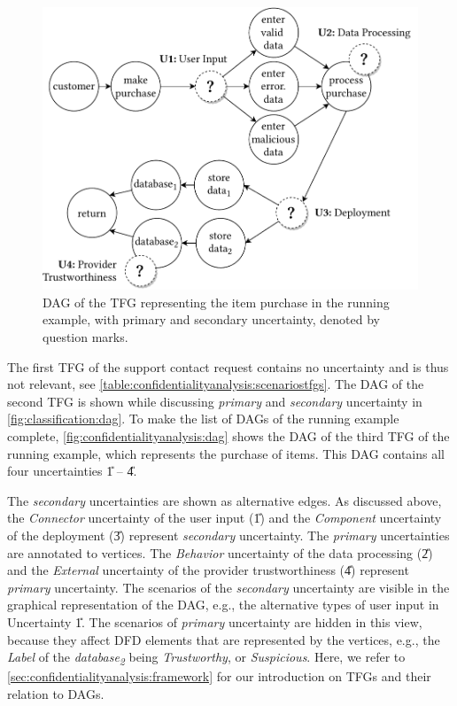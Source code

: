 \begin{figure}
    \centering
    \includegraphics[width=0.9\linewidth]{figures/chapter7/lastdag.pdf}
    \caption{\acf*{DAG} of the \acf*{TFG} representing the item purchase in the running example, with primary and secondary uncertainty, denoted by question marks.}
    \label{fig:confidentialityanalysis:dag}
\end{figure}

The first \ac{TFG} of the support contact request contains no uncertainty and is thus not relevant, see \autoref{table:confidentialityanalysis:scenariostfgs}.
The \ac{DAG} of the second \ac{TFG} is shown while discussing \emph{primary} and \emph{secondary} uncertainty in \autoref{fig:classification:dag}.
To make the list of \acp{DAG} of the running example complete, \autoref{fig:confidentialityanalysis:dag} shows the \ac{DAG} of the third \ac{TFG} of the running example, which represents the purchase of items.
This \ac{DAG} contains all four uncertainties \U{1} -- \U{4}.

The \emph{secondary} uncertainties are shown as alternative edges.
As discussed above, the \emph{Connector} uncertainty of the user input (\U{1}) and the \emph{Component} uncertainty of the deployment (\U{3}) represent \emph{secondary} uncertainty.
The \emph{primary} uncertainties are annotated to vertices.
The \emph{Behavior} uncertainty of the data processing (\U{2}) and the \emph{External} uncertainty of the provider trustworthiness (\U{4}) represent \emph{primary} uncertainty.
The scenarios of the \emph{secondary} uncertainty are visible in the graphical representation of the \ac{DAG}, e.g., the alternative types of user input in Uncertainty \U{1}.
The scenarios of \emph{primary} uncertainty are hidden in this view, because they affect \ac{DFD} elements that are represented by the vertices, e.g., the \emph{Label} of the \emph{database\textsubscript{2}} being \emph{Trustworthy}, or \emph{Suspicious}.
Here, we refer to \autoref{sec:confidentialityanalysis:framework} for our introduction on \acp{TFG} and their relation to \acp{DAG}.

